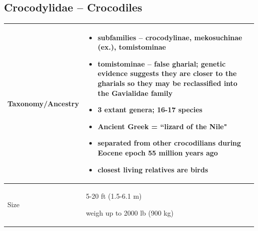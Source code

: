 
\subsection{Crocodylidae -- Crocodiles}
\begin{center}
\begin{longtabu} to 
	\hline
	Taxonomy/Ancestry & 
	\begin{itemize}[noitemsep]
		\item subfamilies -- crocodylinae, mekosuchinae (ex.), tomistominae
		\item \textbf{tomistominae} -- false gharial; genetic evidence suggests they are closer to the gharials so they may be reclassified into the Gavialidae family
		\item 3 extant genera; 16-17 species
		\item Ancient Greek = ``lizard of the Nile"
		\item separated from other crocodilians during Eocene epoch 55 million years ago
		\item closest living relatives are birds
	\end{itemize}
	\\
	\hline
	Size & 
	5-20 ft (1.5-6.1 m)
	
	weigh up to 2000 lb (900 kg)
	

\end{longtabu}
\end{center}
